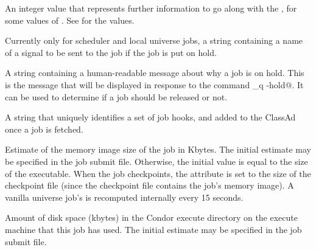 \begin{description}
\item[\AdAttr{HoldReasonSubCode}:]    An integer value that represents further
information to go along with the , for
some values of .
See  for the values.

\item[\AdAttr{HoldKillSig}:]    Currently only for scheduler and local
universe jobs,
a string containing a name of
a signal to be sent to the job if the job is put on hold.

\item[\AdAttr{HoldReason}:]    A string containing a human-readable
message about why a job is on hold.
This is the message that will be displayed in response to
the command \verb@condor_q -hold@.
It can be used to determine if a job should be released or not.

\item[\AdAttr{HookKeyword}:] A string that uniquely identifies
a set of job hooks, and added to the ClassAd once a job is fetched.

\item[\AdAttr{ImageSize}:]  Estimate of the memory image size of the
job in Kbytes.  The initial estimate may be specified in the job
submit file.  Otherwise, the initial value is equal to the size of the
executable.  When the job checkpoints, the 
attribute is set to the size of the checkpoint file (since the
checkpoint file contains the job's memory image).
A vanilla universe job's  is recomputed
internally every 15 seconds.

\item[\AdAttr{DiskUsage}:] Amount of disk space (kbytes) in the Condor
execute directory on the execute machine that this job has used.
The initial estimate may be specified in the job
submit file.


\end{description}
